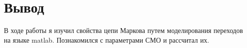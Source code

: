 \chapter{Вывод}
\label{ch:сhap5}

В ходе работы я изучил свойства цепи Маркова путем моделирования переходов на языке matlab. 
Познакомился с параметрами СМО и рассчитал их.

\endinput